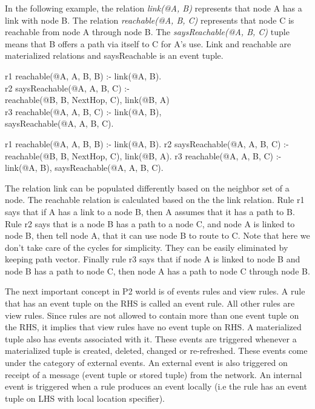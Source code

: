 In the following example, the relation {\em link(@A, B)} represents that
node A has a link with node B. The relation {\em reachable(@A, B, C)}
represents that node C is reachable from node A through node B. The {\em
  saysReachable(@A, B, C)} tuple means that B offers a path via itself
to C for A's use. Link and reachable are materialized relations and saysReachable is an event tuple.
\begin{code}
r1 reachable(@A, A, B, B) :- link(@A, B).\\
r2 saysReachable(@A, A, B, C) :- \\
\> reachable(@B, B, NextHop, C), link(@B, A)\\
r3 reachable(@A, A, B, C) :- link(@A, B), \\
\> saysReachable(@A, A, B, C).
\end{code}
\begin{overlog}
r1 reachable(@A, A, B, B) :- link(@A, B).
r2 saysReachable(@A, A, B, C) :- 
  reachable(@B, B, NextHop, C), link(@B, A).
r3 reachable(@A, A, B, C) :- link(@A, B),
  saysReachable(@A, A, B, C).
\end{overlog}

The relation link can be populated differently based on the neighbor set of a node. The reachable relation is calculated based on the the link relation. Rule r1 says that if A has a link to a node B, then A assumes that it has a path to B. Rule r2 says that is a node B has a path to a node C, and node A is linked to node B, then tell node A, that it can use node B to route to C. Note that here we don't take care of the cycles for simplicity. They can be easily eliminated by keeping path vector. Finally rule r3 says that if node A is linked to node B and node B has a path to node C, then node A has a path to node C through node B. 

The next important concept in P2 world is of events rules and view rules. A rule that has an event tuple on the RHS is called an event rule. All other rules are view rules. Since rules are not allowed to contain more than one event tuple on the RHS, it implies that view rules have no event tuple on RHS. A materialized tuple also has events associated with it. These events are triggered whenever a materialized tuple is created, deleted, changed or re-refreshed. These events come under the category of external events. An external event is also triggered on receipt of a message (event tuple or stored tuple) from the network. An internal event is triggered when a rule produces an event locally (i.e the rule has an event tuple on LHS with local location specifier). 

